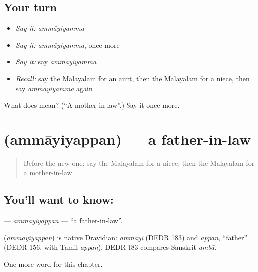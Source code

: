 \subsection*{Your turn}
\begin{itemize}
\raggedright
  \item \emph{Say it:} \emph{ammāyiyamma}
  \item \emph{Say it:} \emph{ammāyiyamma}, once more
  \item \emph{Say it:} say \emph{ammāyiyamma}
  \item \emph{Recall:} say the Malayalam for an aunt, then the Malayalam for a niece, then say \emph{ammāyiyamma} again
\end{itemize}

\begin{tcolorbox}[breakable,colback=teal!4,colframe=teal!35!black,title={Before you move on}]
What does  mean? (\textquotedblleft{}A mother-in-law\textquotedblright{}.) Say it once more.
\end{tcolorbox}
\section[\texorpdfstring{\ml{അമ്മായിയപ്പൻ} (ammāyiyappan)}{അമ്മായിയപ്പൻ (ammāyiyappan)}]{ (ammāyiyappan) — a father-in-law}

\label{lesson:ML-C289-ammayiyappan}



\begin{quote}
Before the new one: say the Malayalam for a niece, then the Malayalam for a mother-in-law.
\end{quote}

\subsection*{You'll want to know: }
\textbf{} — \emph{ammāyiyappan} — \textquotedblleft{}a father-in-law\textquotedblright{}.

\begin{cousinweb}
\textbf{} (\emph{ammāyiyappan}) is native Dravidian: \emph{ammāyi} (DEDR 183) and \emph{appan}, \textquotedblleft{}father\textquotedblright{} (DEDR 156, with Tamil \emph{appaṉ}). DEDR 183 compares Sanskrit \emph{ambā}.
\end{cousinweb}

\begin{grammarlens}[title={What you've built}]
One more word for this chapter.
\end{grammarlens}

